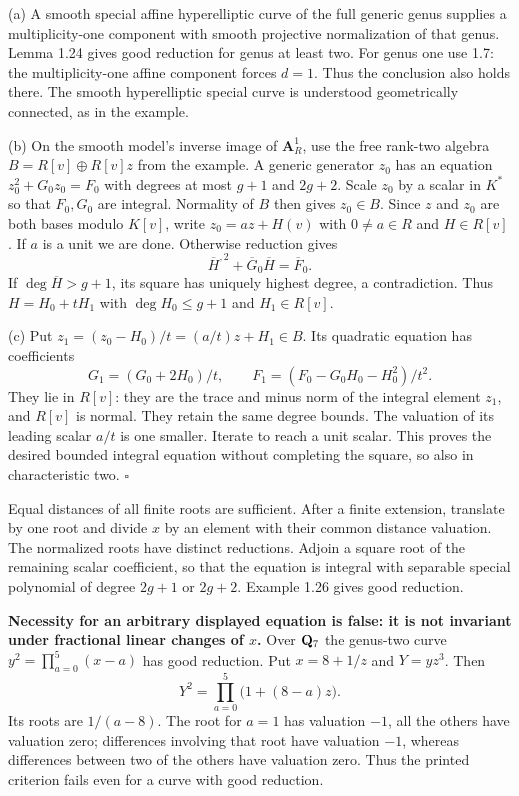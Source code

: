 \documentclass[11pt]{article}
\let\chapterexercise\exercise
\renewcommand{\exercise}[2]{\Needspace{8\baselineskip}\chapterexercise{#1}{#2}}
\begin{document}
\pf (a) A smooth special affine hyperelliptic curve of the full generic genus supplies a multiplicity-one component with smooth projective normalization of that genus. Lemma 1.24 gives good reduction for genus at least two. For genus one use 1.7: the multiplicity-one affine component forces $d=1$. Thus the conclusion also holds there. The smooth hyperelliptic special curve is understood geometrically connected, as in the example.

(b) On the smooth model's inverse image of $\mathbf A^1_R$, use the free rank-two algebra $B=R[v]\oplus R[v]z$ from the example. A generic generator $z_0$ has an equation $z_0^2+G_0z_0=F_0$ with degrees at most $g+1$ and $2g+2$. Scale $z_0$ by a scalar in $K^*$ so that $F_0,G_0$ are integral. Normality of $B$ then gives $z_0\in B$. Since $z$ and $z_0$ are both bases modulo $K[v]$, write $z_0=az+H(v)$ with $0\ne a\in R$ and $H\in R[v]$. If $a$ is a unit we are done. Otherwise reduction gives
\[ \overline H^{,2}+\overline G_0\overline H=\overline F_0. \]
If $\deg\overline H>g+1$, its square has uniquely highest degree, a contradiction. Thus $H=H_0+tH_1$ with $\deg H_0\le g+1$ and $H_1\in R[v]$.

(c) Put $z_1=(z_0-H_0)/t=(a/t)z+H_1\in B$. Its quadratic equation has coefficients
\[ G_1=(G_0+2H_0)/t,\qquad
F_1=(F_0-G_0H_0-H_0^2)/t^2. \]
They lie in $R[v]$: they are the trace and minus norm of the integral element $z_1$, and $R[v]$ is normal. They retain the same degree bounds. The valuation of its leading scalar $a/t$ is one smaller. Iterate to reach a unit scalar. This proves the desired bounded integral equation without completing the square, so also in characteristic two. \hfill$\square$

\pf Equal distances of all finite roots are sufficient. After a finite extension, translate by one root and divide $x$ by an element with their common distance valuation. The normalized roots have distinct reductions. Adjoin a square root of the remaining scalar coefficient, so that the equation is integral with separable special polynomial of degree $2g+1$ or $2g+2$. Example 1.26 gives good reduction.

\textbf{Necessity for an arbitrary displayed equation is false: it is not invariant under fractional linear changes of $x$.} Over $\mathbf Q_7$ the genus-two curve $y^2=\prod_{a=0}^5(x-a)$ has good reduction. Put $x=8+1/z$ and $Y=yz^3$. Then
\[ Y^2=\prod_{a=0}^5\bigl(1+(8-a)z\bigr). \]
Its roots are $1/(a-8)$. The root for $a=1$ has valuation $-1$, all the others have valuation zero; differences involving that root have valuation $-1$, whereas differences between two of the others have valuation zero. Thus the printed criterion fails even for a curve with good reduction.
\end{document}
